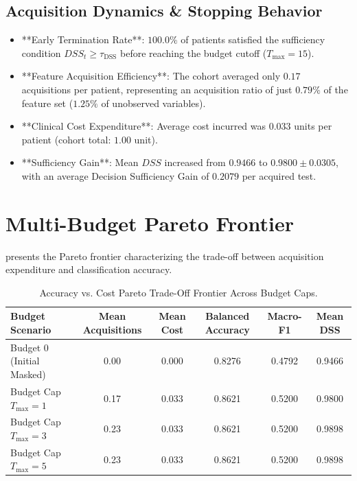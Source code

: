 \documentclass[11pt,a4paper]{report}
\begin{document}
\subsection{Acquisition Dynamics \& Stopping Behavior}
\begin{itemize}[noitemsep]
  \item **Early Termination Rate**: $100.0\%$ of patients satisfied the sufficiency condition $DSS_t \ge \tau_{\text{DSS}}$ before reaching the budget cutoff ($T_{\max} = 15$).
  \item **Feature Acquisition Efficiency**: The cohort averaged only $0.17$ acquisitions per patient, representing an acquisition ratio of just $0.79\%$ of the feature set ($1.25\%$ of unobserved variables).
  \item **Clinical Cost Expenditure**: Average cost incurred was $0.033$ units per patient (cohort total: $1.00$ unit).
  \item **Sufficiency Gain**: Mean $DSS$ increased from $0.9466$ to $0.9800 \pm 0.0305$, with an average Decision Sufficiency Gain of $0.2079$ per acquired test.
\end{itemize}

\section{Multi-Budget Pareto Frontier}
 presents the Pareto frontier characterizing the trade-off between acquisition expenditure and classification accuracy.

\begin{table}[htbp]
  \centering
  \small
  \caption{Accuracy vs. Cost Pareto Trade-Off Frontier Across Budget Caps.}
  \label{tab:pareto_frontier}
  \begin{tabular}{lccccc}
    \toprule
    \textbf{Budget Scenario} & \textbf{Mean Acquisitions} & \textbf{Mean Cost} & \textbf{Balanced Accuracy} & \textbf{Macro-F1} & \textbf{Mean DSS} \\
    \midrule
    Budget 0 (Initial Masked) & 0.00 & 0.000 & 0.8276 & 0.4792 & 0.9466 \\
    Budget Cap $T_{\max} = 1$ & 0.17 & 0.033 & 0.8621 & 0.5200 & 0.9800 \\
    Budget Cap $T_{\max} = 3$ & 0.23 & 0.033 & 0.8621 & 0.5200 & 0.9898 \\
    Budget Cap $T_{\max} = 5$ & 0.23 & 0.033 & 0.8621 & 0.5200 & 0.9898 \\
    \bottomrule
  \end{tabular}
\end{table}
\end{document}
